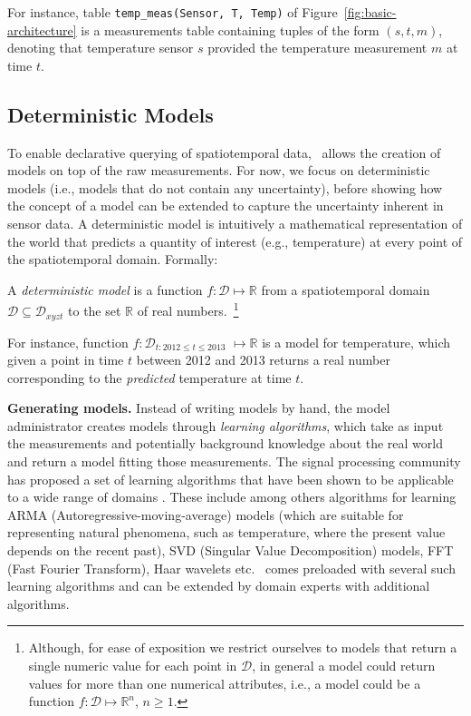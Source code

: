 \begin{example}
For instance, table \texttt{temp\_meas(Sensor, T, Temp)} of Figure~\ref{fig:basic-architecture} is a measurements table containing tuples of the form $(s, t, m)$, denoting that temperature sensor $s$ provided the temperature measurement $m$ at time $t$.
\end{example}

\subsection{Deterministic Models}
\label{sec:deterministic-models}

To enable declarative querying of spatiotemporal data, \projName\ allows the creation of models on top of the raw measurements. For now, we focus on deterministic models (i.e., models that do not contain any uncertainty), before showing how the concept of a model can be extended to capture the uncertainty inherent in sensor data. A deterministic model is intuitively a mathematical representation of the world that predicts a quantity of interest (e.g., temperature) at every point of the spatiotemporal domain. Formally:

\begin{defin}
A {\em deterministic model} is a function $f:\mathcal{D}\mapsto \mathbb{R}$ from a spatiotemporal domain $\mathcal{D} \subseteq \mathcal{D}_{xyzt}$ to the set $\mathbb{R}$ of real numbers.~\footnote{Although, for ease of exposition we restrict ourselves to models that return a single numeric value for each point in $\mathcal{D}$, in general a model could return values for more than one numerical attributes, i.e., a model could be a function  $f:\mathcal{D}\mapsto \mathbb{R}^n$, $n \ge 1$.}
\end{defin}

\begin{example}
For instance, function $f:\mathcal{D}_{t: 2012 \leq t \leq 2013}$ $\mapsto \mathbb{R}$ is a model for temperature, which given a point in time $t$ between 2012 and 2013 returns a real number corresponding to the \emph{predicted} temperature at time $t$.
\end{example}

{\bf Generating models.} Instead of writing models by hand, the model administrator creates models through {\em learning algorithms}, which take as input the measurements and potentially background knowledge about the real world and return a model fitting those measurements. The signal processing community has proposed a set of learning algorithms that have been shown to be applicable to a wide range of domains \cite{dsp}. These include among others algorithms for learning ARMA (Autoregressive-moving-average) models (which are suitable for representing natural phenomena, such as temperature, where the present value depends on the recent past), SVD (Singular Value Decomposition) models, FFT (Fast Fourier Transform), Haar wavelets etc. \projName\ comes preloaded with several such learning algorithms and can be extended by domain experts with additional algorithms.

